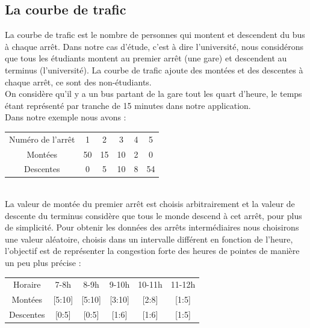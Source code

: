 \documentclass[a4paper,11pt]{article}
\begin{document}
	\subsection{La courbe de trafic}
		La courbe de trafic est le nombre de personnes qui montent et descendent du bus à chaque arrêt. Dans notre cas d'étude, c'est à dire l'université, nous considérons que tous les étudiants montent au premier arrêt (une gare) et descendent au terminus (l'université). La courbe de trafic ajoute des montées et des descentes à chaque arrêt, ce sont des non-étudiants. \\
		On considère qu'il y a un bus partant de la gare tout les quart d'heure, le temps étant représenté par tranche de 15 minutes dans notre application.\\
		Dans notre exemple nous avons : \\
		\begin{tabular}{ | c | c | c | c | c | c |}
 			\hline			
   			Numéro de l'arrêt & 1 & 2 & 3 & 4 & 5\\
   			Montées & 50 & 15 & 10 & 2 & 0 \\
   			Descentes & 0 & 5 & 10 & 8 & 54\\
 			\hline  
 		\end{tabular}\\
 		La valeur de montée du premier arrêt est choisis arbitrairement et la valeur de descente du terminus considère que tous le monde descend à cet arrêt, pour plus de simplicité. 
 		Pour obtenir les données des arrêts intermédiaires nous choisirons une valeur aléatoire, choisis dans un intervalle différent en fonction de l'heure, l'objectif est de représenter la congestion forte des heures de pointes de manière un peu plus précise : \\
 		\begin{tabular}{ | c | c | c | c | c | c |}
 			\hline			
   			Horaire & 7-8h & 8-9h & 9-10h & 10-11h & 11-12h\\
   			Montées & [5:10] & [5:10] & [3:10] & [2:8] & [1:5] \\
   			Descentes & [0:5] & [0:5] & [1:6] & [1:6] & [1:5]\\
 			\hline  
 		\end{tabular}\\
\end{document}
